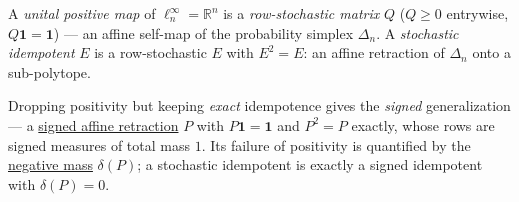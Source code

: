 \hypertarget{def:stochastic}{}%
\begin{definition}\label{def:stochastic}
A \emph{unital positive map} of $\ell^\infty_n=\mathbb R^n$ is a
\emph{row-stochastic matrix} $Q$ ($Q\ge0$ entrywise, $Q\mathbf 1=\mathbf 1$) --- an affine self-map of the
probability simplex $\Delta_n$. A \emph{stochastic idempotent} $E$ is a row-stochastic $E$ with $E^2=E$: an
affine retraction of $\Delta_n$ onto a sub-polytope.

Dropping positivity but keeping \emph{exact} idempotence gives the \emph{signed} generalization --- a
\hyperref[def:signed-idempotent]{signed affine retraction} $P$ with $P\mathbf 1=\mathbf 1$ and $P^2=P$ exactly,
whose rows are signed measures of total mass $1$. Its failure of positivity is quantified by the
\hyperref[def:negative-mass]{negative mass} $\delta(P)$; a stochastic idempotent is exactly a signed idempotent
with $\delta(P)=0$.
\end{definition}

